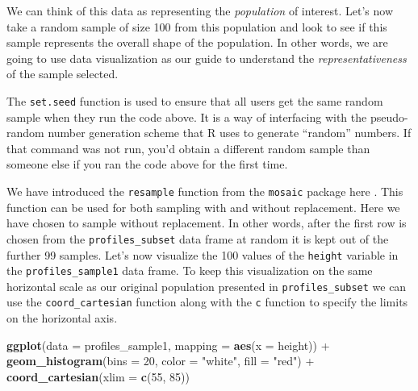 \documentclass[]{tufte-book}
\newenvironment{Shaded}{\begin{snugshade}}{\end{snugshade}}
\newcommand{\KeywordTok}[1]{\textcolor[rgb]{0.13,0.29,0.53}{\textbf{{#1}}}}
\newcommand{\DataTypeTok}[1]{\textcolor[rgb]{0.13,0.29,0.53}{{#1}}}
\newcommand{\DecValTok}[1]{\textcolor[rgb]{0.00,0.00,0.81}{{#1}}}
\newcommand{\StringTok}[1]{\textcolor[rgb]{0.31,0.60,0.02}{{#1}}}
\newcommand{\OtherTok}[1]{\textcolor[rgb]{0.56,0.35,0.01}{{#1}}}
\newcommand{\NormalTok}[1]{{#1}}
\theoremstyle{definition}
\theoremstyle{definition}
\theoremstyle{remark}
\begin{document}
We can think of this data as representing the \emph{population} of
interest. Let's now take a random sample of size 100 from this
population and look to see if this sample represents the overall shape
of the population. In other words, we are going to use data
visualization as our guide to understand the \emph{representativeness}
of the sample selected.

\begin{Shaded}
\end{Shaded}

The \texttt{set.seed} function is used to ensure that all users get the
same random sample when they run the code above. It is a way of
interfacing with the pseudo-random number generation scheme that R uses
to generate ``random'' numbers. If that command was not run, you'd
obtain a different random sample than someone else if you ran the code
above for the first time.

We have introduced the \texttt{resample} function from the
\texttt{mosaic} package here \citep{R-mosaic}. This function can be used
for both sampling with and without replacement. Here we have chosen to
sample without replacement. In other words, after the first row is
chosen from the \texttt{profiles\_subset} data frame at random it is
kept out of the further 99 samples. Let's now visualize the 100 values
of the \texttt{height} variable in the \texttt{profiles\_sample1} data
frame. To keep this visualization on the same horizontal scale as our
original population presented in \texttt{profiles\_subset} we can use
the \texttt{coord\_cartesian} function along with the \texttt{c}
function to specify the limits on the horizontal axis.

\begin{Shaded}
\begin{Highlighting}[]
\KeywordTok{ggplot}\NormalTok{(}\DataTypeTok{data =} \NormalTok{profiles_sample1, }\DataTypeTok{mapping =} \KeywordTok{aes}\NormalTok{(}\DataTypeTok{x =} \NormalTok{height)) +}
\StringTok{  }\KeywordTok{geom_histogram}\NormalTok{(}\DataTypeTok{bins =} \DecValTok{20}\NormalTok{, }\DataTypeTok{color =} \StringTok{"white"}\NormalTok{, }\DataTypeTok{fill =} \StringTok{"red"}\NormalTok{) +}
\StringTok{  }\KeywordTok{coord_cartesian}\NormalTok{(}\DataTypeTok{xlim =} \KeywordTok{c}\NormalTok{(}\DecValTok{55}\NormalTok{, }\DecValTok{85}\NormalTok{))}
\end{Highlighting}
\end{Shaded}
\end{document}
